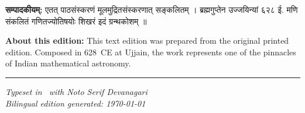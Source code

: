 \documentclass[11pt,a4paper]{article}
\newcommand{\dev}[1]{{\devanagarifont\mdseries\upshape #1}}
\newcommand{\bilingualpair}[2]{%
  \noindent%
  \begin{minipage}[t]{0.47\textwidth}
    \begin{flushleft}
      \small\dev{#1}
    \end{flushleft}
  \end{minipage}%
  \hfill\vrule\hfill%
  \begin{minipage}[t]{0.47\textwidth}
    \begin{flushleft}
      \small #2
    \end{flushleft}
  \end{minipage}%
  \par\vspace{1.2ex}
}
\begin{document}
\vspace{1.5ex}

\bilingualpair{%
\textbf{सम्पादकीयम्:} एतत् पाठसंस्करणं मूलमुद्रितसंस्करणात् सङ्कलितम् । ब्रह्मगुप्तेन उज्जयिन्यां ६२८ ई. मणि संकलितं गणितज्योतिषयोः शिखरं इदं ग्रन्थकोशम् ॥
}{%
\textbf{About this edition:} This text edition was prepared from the original printed edition. Composed in 628~CE at Ujjain, the work represents one of the pinnacles of Indian mathematical astronomy.
}

\vspace{2ex}

\noindent\rule{\textwidth}{0.4pt}
\begin{center}
\small\textit{Typeset in \XeLaTeX\ with Noto Serif Devanagari\\
Bilingual edition generated: \today}
\end{center}
\end{document}
